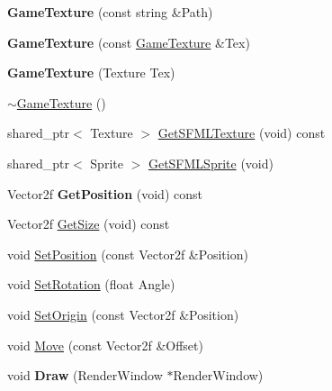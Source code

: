 \begin{DoxyCompactItemize}
\item 
\mbox{\label{class_engine_1_1_core_1_1_game_texture_ae9eb069dd4a60ad5af6e19ca35432ea2}} 
{\bfseries Game\+Texture} (const string \&Path)
\item 
\mbox{\label{class_engine_1_1_core_1_1_game_texture_a5d6076b052118c2212b103cbdf3ea836}} 
{\bfseries Game\+Texture} (const \hyperlink{class_engine_1_1_core_1_1_game_texture}{Game\+Texture} \&Tex)
\item 
\mbox{\label{class_engine_1_1_core_1_1_game_texture_aac115d213538922ab88a656b6780b6b3}} 
{\bfseries Game\+Texture} (Texture Tex)
\item 
\hyperlink{class_engine_1_1_core_1_1_game_texture_a37c2ee2ebfdfc3301b6070d2df10d59a}{$\sim$\+Game\+Texture} ()
\item 
shared\+\_\+ptr$<$ Texture $>$ \hyperlink{class_engine_1_1_core_1_1_game_texture_a18a4679d1538d7390b613d16f3b4bd5a}{Get\+S\+F\+M\+L\+Texture} (void) const
\item 
shared\+\_\+ptr$<$ Sprite $>$ \hyperlink{class_engine_1_1_core_1_1_game_texture_aec2df0beae7b8693160e20c1fd3588ac}{Get\+S\+F\+M\+L\+Sprite} (void)
\item 
\mbox{\label{class_engine_1_1_core_1_1_game_texture_a7bf5f66f2fd297fd9d757e8f9f0cc5e8}} 
Vector2f {\bfseries Get\+Position} (void) const
\item 
Vector2f \hyperlink{class_engine_1_1_core_1_1_game_texture_a7ce550b437a2b17b8cf574c6a91b6f60}{Get\+Size} (void) const
\item 
void \hyperlink{class_engine_1_1_core_1_1_game_texture_ae1f94e0f1b86e99ed4508ccdda4872d6}{Set\+Position} (const Vector2f \&Position)
\item 
void \hyperlink{class_engine_1_1_core_1_1_game_texture_a5ed78714df6128f09c35c25e2271dc05}{Set\+Rotation} (float Angle)
\item 
void \hyperlink{class_engine_1_1_core_1_1_game_texture_aa01df5d689abf48b1d442da329485eeb}{Set\+Origin} (const Vector2f \&Position)
\item 
void \hyperlink{class_engine_1_1_core_1_1_game_texture_af0169ac026c5b15cb3195d1199b13d33}{Move} (const Vector2f \&Offset)
\item 
\mbox{\label{class_engine_1_1_core_1_1_game_texture_a108f525f52213ec94dd9a63d1be9dd0f}} 
void {\bfseries Draw} (Render\+Window $\ast$Render\+Window)
\end{DoxyCompactItemize}


